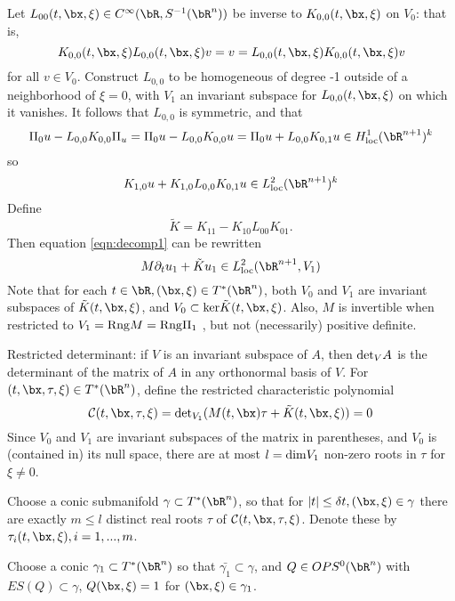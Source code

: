 Let  $L_{00}(t,\bx,\xi) \in C^{\infty}(\bR, S^{-1}(\bR^n))$ be inverse to $K_{0,0}(t,\bx,\xi)$ on $V_0$: that is,
\[
  K_{0,0}(t,\bx,\xi)L_{0,0}(t,\bx,\xi) v=v=L_{0,0}(t,\bx,\xi)K_{0,0}(t,\bx,\xi)v
\]
for all $v \in V_0$. Construct $L_{0,0}$ to be homogeneous of degree -1 outside of a neighborhood of $\xi=0$, with $V_1$ an invariant subspace for $L_{0,0}(t,\bx,\xi)$ on which it vanishes. It follows that $L_{0,0}$ is symmetric, and that
\[
  \Pi_0 u - L_{0,0}K_{0,0}\Pi_u = \Pi_0 u - L_{0,0}K_{0,0}u = \Pi_0 u + L_{0,0}K_{0,1}u \in H^{1}_{\rm loc}(\bR^{n+1})^k
\]
so
\[
  K_{1,0}u + K_{1,0}L_{0,0}K_{0,1}u \in L^2 _{\rm loc}(\bR^{n+1})^k
\]
Define
\[
  \tilde{K} = K_{11} - K_{10}L_{00}K_{01}.
\]
Then equation \ref{eqn:decomp1} can be rewritten
\begin{equation}
  \label{eqn:shs1}
  M\partial_t u_1 + \tilde{K}u_1 \in L^2_{\rm loc}(\bR^{n+1},V_1)
\end{equation}
Note that for each $t \in \bR, (\bx,\xi) \in T^*(\bR^n)$, both $V_0$ and $V_1$ are invariant subspaces of $\tilde{K}(t,\bx,\xi)$, and $V_0 \subset {\rm ker}\tilde{K}(t,\bx,\xi)$. Also, $M$ is invertible when restricted to $V_1 = {\rm Rng} M = {\rm Rng } \Pi_1$ , but not (necessarily) positive definite.
  
Restricted determinant: if $V$ is an invariant subspace of $A$, then ${\rm det}_{V} A$ is the determinant of the matrix of $A$ in any orthonormal basis of $V$.
For $(t,\bx,\tau,\xi) \in T^*(\bR^n)$, define the restricted characteristic polynomial
\[
  {\cal C}(t,\bx,\tau,\xi) = {\rm det}_{V_1} (M(t,\bx)\tau + \tilde{K}(t,\bx,\xi) )= 0
\]
Since $V_0$ and $V_1$ are invariant subspaces of the matrix in parentheses, and $V_0$ is (contained in) its null space, there are at most $l={\rm dim}V_1$ non-zero roots in $\tau$ for $\xi \ne 0$.

Choose a conic submanifold $\gamma \subset T^*(\bR^n)$, so that for $|t| \le \delta t, (\bx,\xi) \in \gamma$ there are exactly $m \le l$ distinct real roots $\tau$ of ${\cal C}(t,\bx,\tau,\xi)$. Denote these by $\tau_i(t,\bx,\xi), i=1,...,m$.

Choose a conic $\gamma_1 \subset T^*(\bR^n)$ so that $\bar{\gamma_1} \subset \gamma$, and $Q \in OPS^0(\bR^n)$ with $ES(Q) \subset \gamma$, $Q(\bx,\xi) =1$ for $(\bx,\xi)\in \gamma_1$.

